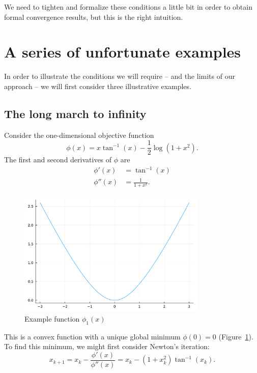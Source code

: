 \documentclass[12pt, leqno]{article} %
\begin{document}
We need to tighten and formalize these conditions a little bit in order
to obtain formal convergence results, but this is the right intuition.

\section{A series of unfortunate examples}

In order to illustrate the conditions we will require -- and the limits
of our approach -- we will first consider three illustrative examples.

\subsection{The long march to infinity}

Consider the one-dimensional objective function
\[\phi(x) = x \tan^{-1}(x) - \frac{1}{2} \log(1+x^2).\] The first and
second derivatives of \(\phi\) are \begin{align*}
  \phi'(x) &= \tan^{-1}(x) \\
  \phi''(x) &= \frac{1}{1+x^2}.
\end{align*}

\begin{figure}
\begin{center}
  \includegraphics[width=0.8\textwidth]{fig/2023-04-17-phi1.pdf}
\end{center}
\caption{Example function $\phi_1(x)$}
\label{fig:phi1}
\end{figure}

This is a convex function with a unique global 
minimum $\phi(0) = 0$ (Figure~\ref{fig:phi1}).
To find this minimum, we might first consider Newton’s iteration:
\[
  x_{k+1} = x_k - \frac{\phi'(x)}{\phi''(x)} = x_k - (1+x_k^2) \tan^{-1}(x_k).
\]
\end{document}

